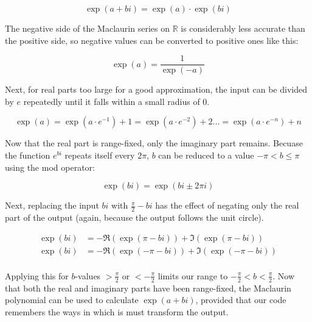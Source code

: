 \documentclass[10pt]{article}
\begin{document}
\[
    \exp(a+bi) = \exp(a) · \exp(bi)
\]

The negative side of the Maclaurin series on $ℝ$ is considerably less accurate than the positive side, so negative values can be converted to positive ones like this:

\[
    \exp(a) = \frac{1}{\exp(-a)}
\]

Next, for real parts too large for a good approximation, the input can be divided by $e$ repeatedly until it falls within a small radius of 0.

\[
    \exp(a) = \exp(a · e^{-1}) + 1
    = \exp(a · e^{-2}) + 2 ...
    = \exp(a · e^{-n}) + n
\]

Now that the real part is range-fixed, only the imaginary part remains. Becuase the function $e^{bi}$ repeats itself every $2π$, $b$ can be reduced to a value $-π < b ≤ π$ using the mod operator:

\[
    \exp(bi) = \exp(bi ± 2πi)
\]

Next, replacing the input $bi$ with $\frac{π}{2} - bi$ has the effect of negating only the real part of the output (again, because the output follows the unit circle).

\begin{align*}
    \exp(bi) &= -\Re(\exp(π - bi)) + \Im(\exp(π - bi)) \\
    \exp(bi) &= -\Re(\exp(-π - bi)) + \Im(\exp(-π - bi)) \\
\end{align*}

Applying this for $b$-values $>\frac{π}{2}$ or $<-\frac{π}{2}$ limits our range to $-\frac{π}{2} < b < \frac{π}{2}$. Now that both the real and imaginary parts have been range-fixed, the Maclaurin polynomial can be used to calculate $\exp(a+bi)$, provided that our code remembers the ways in which is must transform the output.
\end{document}
